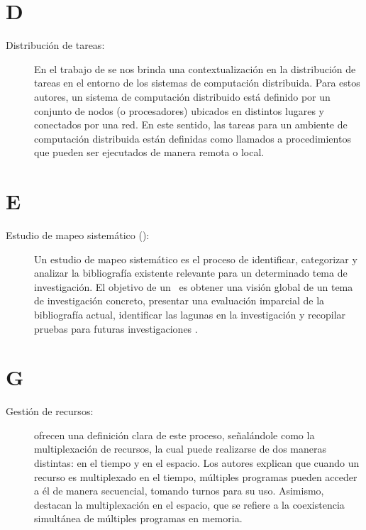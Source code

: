 \section*{D}
\begin{description}
	\item[Distribución de tareas:] En el trabajo de \cite{Oldham1995} se nos brinda una contextualización en la distribución de tareas en el entorno de los sistemas de computación distribuida. Para estos autores, un sistema de computación distribuido está definido por un conjunto de nodos (o procesadores) ubicados en distintos lugares y conectados por una red. En este sentido, las tareas para un ambiente de computación distribuida están definidas como llamados a procedimientos que pueden ser ejecutados de manera remota o local.
\end{description}

\section*{E}
\begin{description}
	\item[Estudio de mapeo sistemático (\SMS):] Un estudio de mapeo sistemático es el proceso de identificar, categorizar y analizar la bibliografía existente relevante para un determinado tema de investigación. El objetivo de un \SMS~es obtener una visión global de un tema de investigación concreto, presentar una evaluación imparcial de la bibliografía actual, identificar las lagunas en la investigación y recopilar pruebas para futuras investigaciones \citep{Salama2017}.
\end{description}

\section*{G}
\begin{description}
	\item[Gestión de recursos:] \cite{Tanenbaum2015} ofrecen una definición clara de este proceso, señalándole como la multiplexación de recursos, la cual puede realizarse de dos maneras distintas: en el tiempo y en el espacio. Los autores explican que cuando un recurso es multiplexado en el tiempo, múltiples programas pueden acceder a él de manera secuencial, tomando turnos para su uso. Asimismo, destacan la multiplexación en el espacio, que se refiere a la coexistencia simultánea de múltiples programas en memoria.
\end{description}

